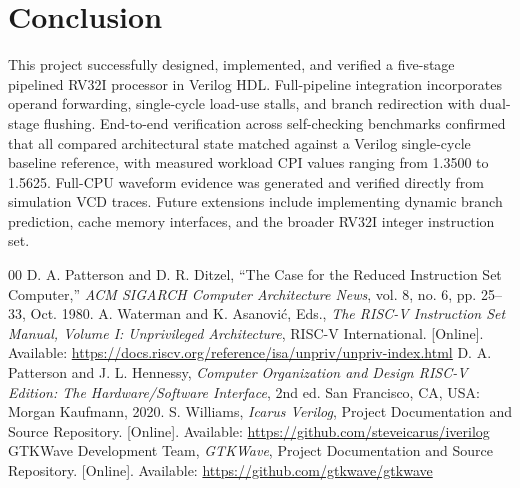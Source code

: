 \documentclass[conference]{IEEEtran}
\begin{document}
\FloatBarrier
\section{Conclusion}
This project successfully designed, implemented, and verified a five-stage pipelined RV32I processor in Verilog HDL. Full-pipeline integration incorporates operand forwarding, single-cycle load-use stalls, and branch redirection with dual-stage flushing. End-to-end verification across self-checking benchmarks confirmed that all compared architectural state matched against a Verilog single-cycle baseline reference, with measured workload CPI values ranging from 1.3500 to 1.5625. Full-CPU waveform evidence was generated and verified directly from simulation VCD traces. Future extensions include implementing dynamic branch prediction, cache memory interfaces, and the broader RV32I integer instruction set.

\begin{thebibliography}{00}
 D. A. Patterson and D. R. Ditzel, ``The Case for the Reduced Instruction Set Computer,'' \emph{ACM SIGARCH Computer Architecture News}, vol. 8, no. 6, pp. 25--33, Oct. 1980.
 A. Waterman and K. Asanovi\'{c}, Eds., \emph{The RISC-V Instruction Set Manual, Volume I: Unprivileged Architecture}, RISC-V International. [Online]. Available: \url{https://docs.riscv.org/reference/isa/unpriv/unpriv-index.html}
 D. A. Patterson and J. L. Hennessy, \emph{Computer Organization and Design RISC-V Edition: The Hardware/Software Interface}, 2nd ed. San Francisco, CA, USA: Morgan Kaufmann, 2020.
 S. Williams, \emph{Icarus Verilog}, Project Documentation and Source Repository. [Online]. Available: \url{https://github.com/steveicarus/iverilog}
 GTKWave Development Team, \emph{GTKWave}, Project Documentation and Source Repository. [Online]. Available: \url{https://github.com/gtkwave/gtkwave}
\end{thebibliography}
\end{document}
